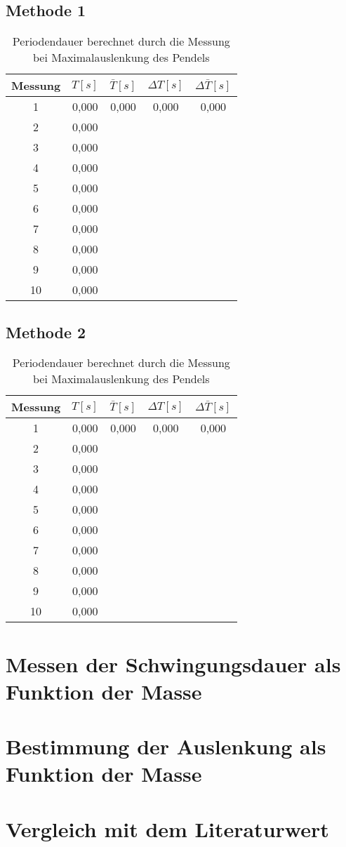 \subsection*{Methode 1}
\begin{table}[h!]
    \centering
    \begin{tabular}{ccccc}\toprule
         Messung&  $T[s]$&  $\bar T[s]$& $\Delta T [s]$  & $\Delta \bar T [s]$\\\midrule
         1& 0,000 & 0,000 & 0,000 & 0,000\\
         2& 0,000 &  &  & \\
         3& 0,000 &  &  & \\
         4& 0,000 &  &  & \\
         5& 0,000 &  &  & \\
         6& 0,000 &  &  & \\
         7& 0,000 &  &  & \\
         8& 0,000 &  &  & \\
         9& 0,000 &  &  & \\
        10& 0,000 & & &\\ \bottomrule 
    \end{tabular}
    \caption{Periodendauer berechnet durch die Messung bei Maximalauslenkung des Pendels}
    \label{tab:periodendauer_Max}
\end{table}

\subsection*{Methode 2}
\begin{table}[h!]
    \centering
    \begin{tabular}{ccccc}\toprule
         Messung&  $T[s]$&  $\bar T[s]$& $\Delta T [s]$  & $\Delta \bar T [s]$\\\midrule
         1& 0,000 & 0,000 & 0,000 & 0,000\\
         2& 0,000 &  &  & \\
         3& 0,000 &  &  & \\
         4& 0,000 &  &  & \\
         5& 0,000 &  &  & \\
         6& 0,000 &  &  & \\
         7& 0,000 &  &  & \\
         8& 0,000 &  &  & \\
         9& 0,000 &  &  & \\
        10& 0,000 & & &\\ \bottomrule 
    \end{tabular}
    \caption{Periodendauer berechnet durch die Messung bei Maximalauslenkung des Pendels}
    \label{tab:periodendauer_Max}
\end{table}

\section{Messen der Schwingungsdauer als Funktion der Masse}
\section{Bestimmung der Auslenkung als Funktion der Masse}
\section{Vergleich mit dem Literaturwert}
